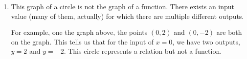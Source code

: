\documentclass[noauthor, nooutcomes]{ximera}
\begin{document}
\begin{example}
\begin{explanation}
\begin{enumerate}[label=\alph*.]
\item 
This graph of a circle is not the graph of a function.  There exists an input value (many of them, actually) for which there are multiple different outputs. 
\begin{image}
\end{image}
 For example, one the graph above, the points $(0,2)$ and $(0,-2)$ are both on the graph.  This tells us that for the input of $x=0$, we have two outputs, $y=2$ and $y=-2$.  This circle represents a relation but not a function.
 
 \end{enumerate}
\end{explanation}
\end{example}
 
 
 
 
\end{document}
